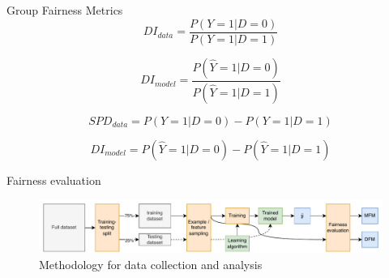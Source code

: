 \documentclass{beamer}
\begin{document}
\begin{frame}[t]{Group Fairness Metrics}
\begin{equation}
  DI_{data} = \frac{P(Y=1|D=0)}{P(Y=1|D=1)}
  \label{eq:di-data}
\end{equation}

\begin{equation}
  DI_{model} = \frac{P(\hat{Y}=1|D=0)}{P(\hat{Y}=1|D=1)}
  \label{eq:di-model}
\end{equation}

\begin{equation}
  SPD_{data} = P(Y=1|D=0)-P(Y=1|D=1)
  \label{eq:spd-data}
\end{equation}

\begin{equation}
  DI_{model} = P(\hat{Y}=1|D=0)-P(\hat{Y}=1|D=1)
  \label{eq:spd-model}
\end{equation}
\end{frame}

\begin{frame}[c]{Fairness evaluation}
  \begin{figure}[c]
  \centering
  \includegraphics[width=0.95\linewidth]{method.pdf}
  \caption{Methodology for data collection and analysis}
  \label{fig:method}
\end{figure}

  
\end{frame}
\end{document}

